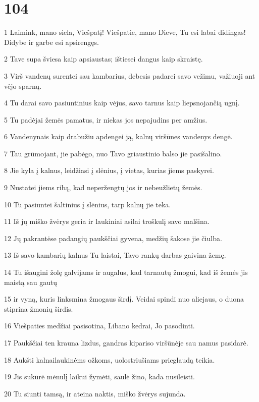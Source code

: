 \chapter{104}


\par 1 Laimink, mano siela, Viešpatį! Viešpatie, mano Dieve, Tu esi labai didingas! Didybe ir garbe esi apsirengęs. 
\par 2 Tave supa šviesa kaip apsiaustas; ištiesei dangus kaip skraistę. 
\par 3 Virš vandenų surentei sau kambarius, debesis padarei savo vežimu, važiuoji ant vėjo sparnų. 
\par 4 Tu darai savo pasiuntinius kaip vėjus, savo tarnus kaip liepsnojančią ugnį. 
\par 5 Tu padėjai žemės pamatus, ir niekas jos nepajudins per amžius. 
\par 6 Vandenynais kaip drabužiu apdengei ją, kalnų viršūnes vandenys dengė. 
\par 7 Tau grūmojant, jie pabėgo, nuo Tavo griaustinio balso jie pasišalino. 
\par 8 Jie kyla į kalnus, leidžiasi į slėnius, į vietas, kurias jiems paskyrei. 
\par 9 Nustatei jiems ribą, kad neperžengtų jos ir nebeužlietų žemės. 
\par 10 Tu pasiuntei šaltinius į slėnius, tarp kalnų jie teka. 
\par 11 Iš jų miško žvėrys geria ir laukiniai asilai troškulį savo malšina. 
\par 12 Jų pakrantėse padangių paukščiai gyvena, medžių šakose jie čiulba. 
\par 13 Iš savo kambarių kalnus Tu laistai, Tavo rankų darbas gaivina žemę. 
\par 14 Tu išaugini žolę galvijams ir augalus, kad tarnautų žmogui, kad iš žemės jis maistą sau gautų 
\par 15 ir vyną, kuris linksmina žmogaus širdį. Veidai spindi nuo aliejaus, o duona stiprina žmonių širdis. 
\par 16 Viešpaties medžiai pasisotina, Libano kedrai, Jo pasodinti. 
\par 17 Paukščiai ten krauna lizdus, gandras kipariso viršūnėje sau namus pasidarė. 
\par 18 Aukšti kalnai­laukinėms ožkoms, uolos­triušiams prieglaudą teikia. 
\par 19 Jis sukūrė mėnulį laikui žymėti, saulė žino, kada nusileisti. 
\par 20 Tu siunti tamsą, ir ateina naktis, miško žvėrys sujunda. 
